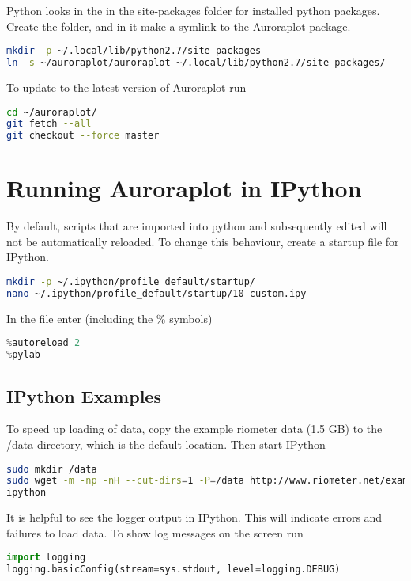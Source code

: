\documentclass{article}
\begin{document}
Python looks in the in the site-packages folder for installed python packages. Create the folder, and in it make a symlink to the Auroraplot package.
\begin{lstlisting}[language=Bash]
mkdir -p ~/.local/lib/python2.7/site-packages
ln -s ~/auroraplot/auroraplot ~/.local/lib/python2.7/site-packages/
\end{lstlisting}

To update to the latest version of Auroraplot run
\begin{lstlisting}[language=Bash]
cd ~/auroraplot/
git fetch --all
git checkout --force master
\end{lstlisting}


\section{Running Auroraplot in IPython}

By default, scripts that are imported into python and subsequently edited will not be automatically reloaded.
To change this behaviour, create a startup file for IPython.

\begin{lstlisting}[language=Bash]
mkdir -p ~/.ipython/profile_default/startup/
nano ~/.ipython/profile_default/startup/10-custom.ipy
\end{lstlisting}

In the file enter (including the \% symbols)
\begin{lstlisting}[language=python]
%load_ext autoreload
%autoreload 2
%pylab
\end{lstlisting}

\subsection{IPython Examples}

To speed up loading of data, copy the example riometer data (1.5 GB) to the /data directory, which is the default location. Then start IPython

\begin{lstlisting}[language=Bash]
sudo mkdir /data
sudo wget -m -np -nH --cut-dirs=1 -P=/data http://www.riometer.net/example_data/2004
ipython
\end{lstlisting}

It is helpful to see the logger output in IPython. This will indicate errors and failures to load data. To show log messages on the screen run
\begin{lstlisting}[language=Python]
import logging
logging.basicConfig(stream=sys.stdout, level=logging.DEBUG)
\end{lstlisting}
\end{document}
